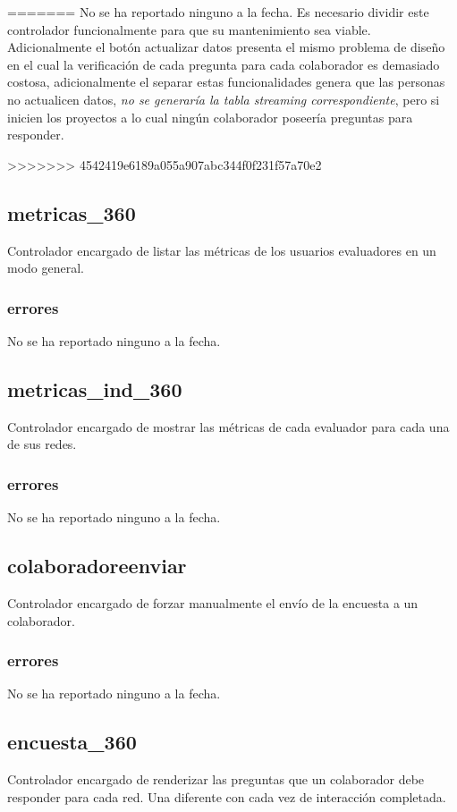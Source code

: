 \documentclass[10pt,a4paper]{book}
\begin{document}
=======
	No se ha reportado ninguno a la fecha. Es necesario dividir este controlador funcionalmente para que su mantenimiento sea viable. Adicionalmente el botón actualizar datos presenta el mismo problema de diseño en el cual la verificación de cada pregunta para cada colaborador es demasiado costosa, adicionalmente el separar estas funcionalidades genera que las personas no actualicen datos, \textit{no se generaría la tabla streaming correspondiente}, pero si inicien los proyectos a lo cual ningún colaborador poseería preguntas para responder.
	
>>>>>>> 4542419e6189a055a907abc344f0f231f57a70e2
	\subsection{metricas\_360}
	Controlador encargado de listar las métricas de los usuarios evaluadores en un modo general.
	\subsubsection{errores}
	No se ha reportado ninguno a la fecha.

	\subsection{metricas\_ind\_360}
	Controlador encargado de mostrar las métricas de cada evaluador para cada una de sus redes.
	\subsubsection{errores}
	No se ha reportado ninguno a la fecha.

	\subsection{colaboradoreenviar}
	Controlador encargado de forzar manualmente el envío de la encuesta a un colaborador.
	\subsubsection{errores}
	No se ha reportado ninguno a la fecha.

	\subsection{encuesta\_360}
	Controlador encargado de renderizar las preguntas que un colaborador debe responder para cada red. Una diferente con cada vez de interacción completada.
\end{document}
